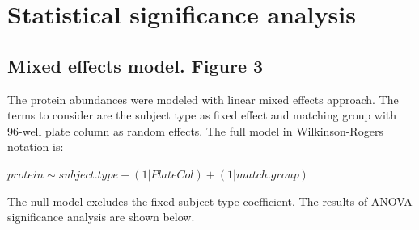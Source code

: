 \documentclass[11pt]{article}\usepackage[]{graphicx}\usepackage[usenames,dvipsnames]{color}
\begin{document}



\clearpage



\section{Statistical significance analysis}
\subsection{Mixed effects model. Figure 3}
The protein abundances were modeled with linear mixed effects approach. 
The terms to consider are the subject type as 
fixed effect and matching group with 96-well plate column as random effects.
The full model in Wilkinson-Rogers notation is:
\begin{center}
$protein \sim subject.type + (1|PlateCol) + (1|match.group)$
\end{center}
The null model excludes the fixed subject type coefficient. The results of ANOVA
significance analysis are shown below.
\end{document}
